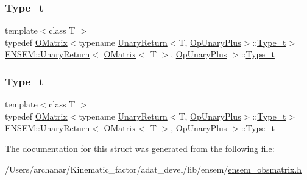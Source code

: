 \subsubsection{\texorpdfstring{Type\_t}{Type\_t}\hspace{0.1cm}{\footnotesize\ttfamily [1/2]}}
{\footnotesize\ttfamily template$<$class T $>$ \\
typedef \mbox{\hyperlink{classENSEM_1_1OMatrix}{O\+Matrix}}$<$typename \mbox{\hyperlink{structENSEM_1_1UnaryReturn}{Unary\+Return}}$<$T, \mbox{\hyperlink{structENSEM_1_1OpUnaryPlus}{Op\+Unary\+Plus}}$>$\+::\mbox{\hyperlink{structENSEM_1_1UnaryReturn_3_01OMatrix_3_01T_01_4_00_01OpUnaryPlus_01_4_a2ba28aeb9736737902accf36b7c69fa1}{Type\+\_\+t}}$>$ \mbox{\hyperlink{structENSEM_1_1UnaryReturn}{E\+N\+S\+E\+M\+::\+Unary\+Return}}$<$ \mbox{\hyperlink{classENSEM_1_1OMatrix}{O\+Matrix}}$<$ T $>$, \mbox{\hyperlink{structENSEM_1_1OpUnaryPlus}{Op\+Unary\+Plus}} $>$\+::\mbox{\hyperlink{structENSEM_1_1UnaryReturn_3_01OMatrix_3_01T_01_4_00_01OpUnaryPlus_01_4_a2ba28aeb9736737902accf36b7c69fa1}{Type\+\_\+t}}}

\mbox{\label{structENSEM_1_1UnaryReturn_3_01OMatrix_3_01T_01_4_00_01OpUnaryPlus_01_4_a2ba28aeb9736737902accf36b7c69fa1}} 
\subsubsection{\texorpdfstring{Type\_t}{Type\_t}\hspace{0.1cm}{\footnotesize\ttfamily [2/2]}}
{\footnotesize\ttfamily template$<$class T $>$ \\
typedef \mbox{\hyperlink{classENSEM_1_1OMatrix}{O\+Matrix}}$<$typename \mbox{\hyperlink{structENSEM_1_1UnaryReturn}{Unary\+Return}}$<$T, \mbox{\hyperlink{structENSEM_1_1OpUnaryPlus}{Op\+Unary\+Plus}}$>$\+::\mbox{\hyperlink{structENSEM_1_1UnaryReturn_3_01OMatrix_3_01T_01_4_00_01OpUnaryPlus_01_4_a2ba28aeb9736737902accf36b7c69fa1}{Type\+\_\+t}}$>$ \mbox{\hyperlink{structENSEM_1_1UnaryReturn}{E\+N\+S\+E\+M\+::\+Unary\+Return}}$<$ \mbox{\hyperlink{classENSEM_1_1OMatrix}{O\+Matrix}}$<$ T $>$, \mbox{\hyperlink{structENSEM_1_1OpUnaryPlus}{Op\+Unary\+Plus}} $>$\+::\mbox{\hyperlink{structENSEM_1_1UnaryReturn_3_01OMatrix_3_01T_01_4_00_01OpUnaryPlus_01_4_a2ba28aeb9736737902accf36b7c69fa1}{Type\+\_\+t}}}



The documentation for this struct was generated from the following file\+:\begin{DoxyCompactItemize}
\item 
/\+Users/archanar/\+Kinematic\+\_\+factor/adat\+\_\+devel/lib/ensem/\mbox{\hyperlink{lib_2ensem_2ensem__obsmatrix_8h}{ensem\+\_\+obsmatrix.\+h}}\end{DoxyCompactItemize}
